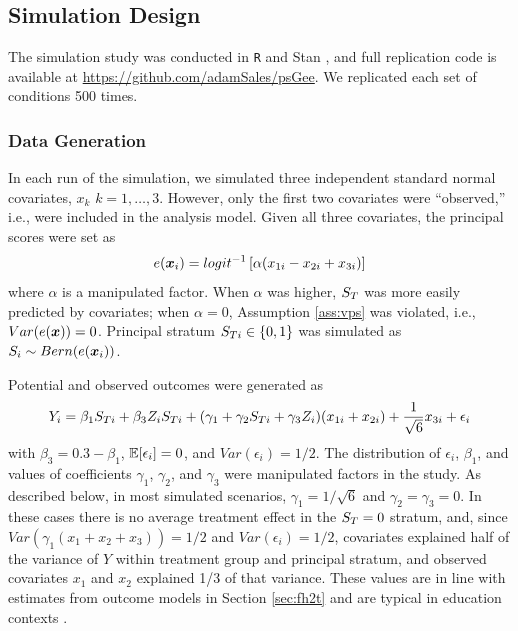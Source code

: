 \documentclass[]{article}
\begin{document}
\subsection{Simulation Design}
The simulation study was conducted in \texttt{R} \citep{rcite} and Stan \citep{rstan}, and full replication code is available at %
\url{https://github.com/adamSales/psGee}.
We replicated each set of conditions 500 times.

\subsubsection{Data Generation}\label{sec:dataGeneration}

In each run of the simulation, we simulated three independent standard normal covariates, $x_k$ $k=1,\dots,3$. However, only the first two covariates were ``observed,'' i.e., were included in the analysis model.
Given all three covariates, the principal scores were set as
\begin{equation*}
  e(\bm{x}_i)=logit^{-1}\left[\alpha(x_{1i}-x_{2i}+x_{3i})\right]
\end{equation*}
where $\alpha$ is a manipulated factor.
When $\alpha$ was higher, $S_T$ was more easily predicted by covariates; when $\alpha=0$, Assumption \ref{ass:vps} was violated, i.e., $Var(e(\bm{x}))=0$.
Principal stratum $S_{Ti}\in \{0,1\}$ was simulated as $S_i\sim Bern(e(\bm{x}_i))$.

\label{potential}Potential and observed outcomes were generated as
\begin{equation}\label{eq:y-sim}
Y_i=\beta_1\sti+\beta_3Z_i\sti+(\gamma_1+\gamma_2\sti+\gamma_3Z_i)(x_{1i}+x_{2i})+\frac{1}{\sqrt{6}}x_{3i}+\epsilon_i%
\end{equation}
with $\beta_3=0.3-\beta_1$, $\mathbb{E}[\epsilon_i]=0$, and $Var(\epsilon_i)=1/2$.
The distribution of $\epsilon_i$, $\beta_1$, and values of coefficients $\gamma_1$, $\gamma_2$, and $\gamma_3$ were manipulated factors in the study.
As described below, in most simulated scenarios, $\gamma_1=1/\sqrt{6}$ and $\gamma_2=\gamma_3=0$. In these cases there is no average treatment effect in the $S_T=0$ stratum, and, since  $Var(\gamma_1(x_1+x_2+x_3))=1/2$ and $Var(\epsilon_i)=1/2$, covariates explained half of the variance of $Y$ within treatment group and principal stratum, and observed covariates $x_1$ and $x_2$ explained 1/3 of that variance.
These values are in line with estimates from outcome models in Section \ref{sec:fh2t} and are typical in education contexts \cite{hedgesHedberg}.
\end{document}

